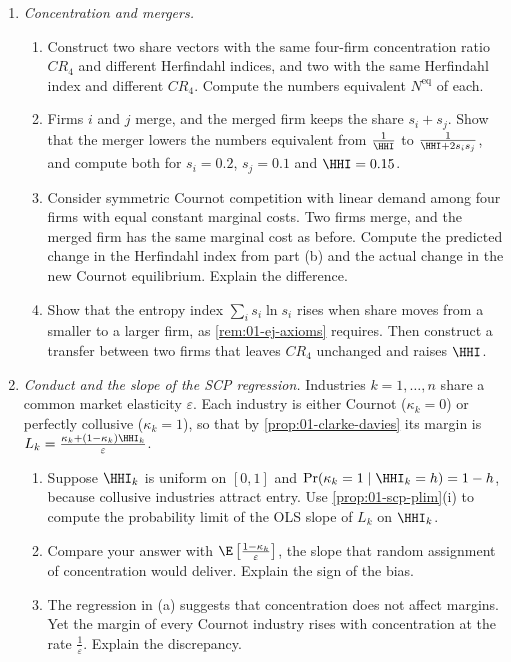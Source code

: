 \begin{enumerate}[label=\arabic*., leftmargin=*, itemsep=6pt]
\item \textit{Concentration and mergers.}
\begin{enumerate}[label=(\alph*)]
  \item Construct two share vectors with the same four-firm concentration ratio $\mathit{CR}_4$ and different
  Herfindahl indices, and two with the same Herfindahl index and different $\mathit{CR}_4$. Compute the numbers
  equivalent $N^{\mathrm{eq}}$ of each.
  \item Firms $i$ and $j$ merge, and the merged firm keeps the share $s_i + s_j$. Show that the merger lowers the
  numbers equivalent from $\frac{1}{\HHI}$ to $\frac{1}{\HHI + 2 s_i s_j}$, and compute both for $s_i = 0.2$,
  $s_j = 0.1$ and $\HHI = 0.15$.
  \item Consider symmetric Cournot competition with linear demand among four firms with equal constant marginal
  costs. Two firms merge, and the merged firm has the same marginal cost as before. Compute the predicted change
  in the Herfindahl index from part (b) and the actual change in the new Cournot equilibrium. Explain the
  difference.
  \item Show that the entropy index $\sum_i s_i \ln s_i$ rises when share moves from a smaller to a larger
  firm, as \cref{rem:01-ej-axioms} requires. Then construct a transfer between two firms that leaves
  $\mathit{CR}_4$ unchanged and raises $\HHI$.
\end{enumerate}

\item \textit{Conduct and the slope of the SCP regression.} Industries $k = 1, \dots, n$ share a common market
elasticity $\varepsilon$. Each industry is either Cournot ($\kappa_k = 0$) or perfectly collusive
($\kappa_k = 1$), so that by \cref{prop:01-clarke-davies} its margin is
$L_k = \frac{\kappa_k + (1 - \kappa_k)\HHI_k}{\varepsilon}$.
\begin{enumerate}[label=(\alph*)]
  \item Suppose $\HHI_k$ is uniform on $[0, 1]$ and $\Pr(\kappa_k = 1 \mid \HHI_k = h) = 1 - h$, because collusive
  industries attract entry. Use \cref{prop:01-scp-plim}(i) to compute the probability limit of the OLS slope of
  $L_k$ on $\HHI_k$.
  \item Compare your answer with $\E\left[\frac{1 - \kappa_k}{\varepsilon}\right]$, the slope that random
  assignment of concentration would deliver. Explain the sign of the bias.
  \item The regression in (a) suggests that concentration does not affect margins. Yet the margin of every
  Cournot industry rises with concentration at the rate $\frac{1}{\varepsilon}$. Explain the discrepancy.
\end{enumerate}


\end{enumerate}

